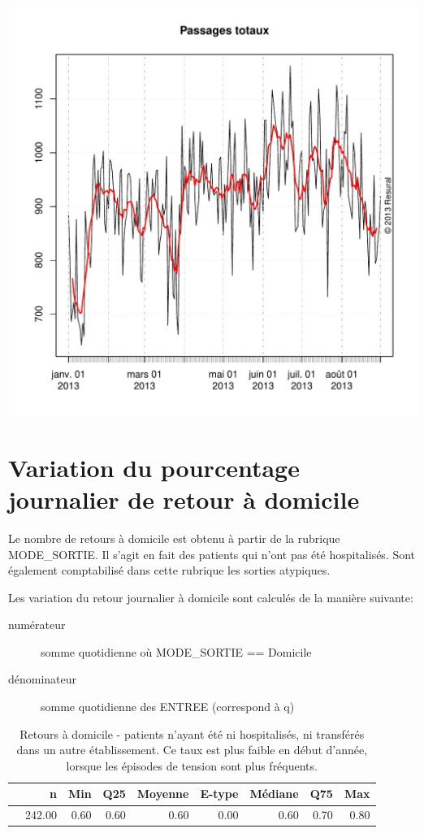 \documentclass[12pt,english,french,twoside]{report}\usepackage[]{graphicx}\usepackage[]{color}
\makeatletter
\def\maxwidth{ %
  \ifdim\Gin@nat@width>\linewidth
    \linewidth
  \else
    \Gin@nat@width
  \fi
}
\makeatother
\begin{document}
\includegraphics[width=\maxwidth]{figure/passages_totaux3} 




\section{Variation du pourcentage journalier de retour à domicile}

Le nombre de retours à domicile est obtenu à partir de la rubrique MODE\_SORTIE. Il s'agit en fait des patients qui n'ont pas été hospitalisés. Sont également comptabilisé dans cette rubrique les sorties atypiques.

Les variation du retour journalier à domicile sont calculés de la manière suivante:
\begin{description}
  \item[numérateur] somme quotidienne où MODE\_SORTIE == Domicile
  \item[dénominateur] somme quotidienne des ENTREE (correspond à q)
\end{description}

\begin{table}[ht]
\centering
\begin{tabular}{rrrrrrrrr}
  \hline
 & n & Min & Q25 & Moyenne & E-type & Médiane & Q75 & Max \\ 
  \hline
 & 242.00 & 0.60 & 0.60 & 0.60 & 0.00 & 0.60 & 0.70 & 0.80 \\ 
   \hline
\end{tabular}
\caption[Retour à domicile]{Retours à domicile - patients n'ayant été ni hospitalisés, ni transférés dans un autre établissement. Ce taux est plus faible en début d'année, lorsque les épisodes de tension sont plus fréquents.} 
\label{tab:rd}
\end{table}
\end{document}
